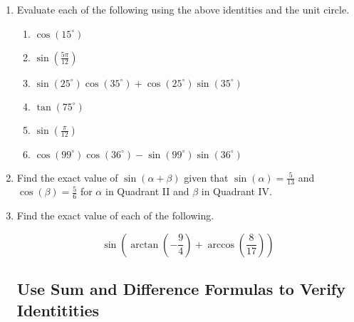 \begin{enumerate}
\vspace{-.1in}
\item Evaluate each of the following using the above identities and the unit circle.


\begin{enumerate}
\item $\cos\left(15^{\circ}\right)$
\vfill

\item $\sin\left(\frac{5\pi}{12}\right)$
\vfill

\newpage

\item $\sin\left(25^{\circ}\right)\cos\left(35^{\circ}\right) +\cos\left(25^{\circ}\right)\sin\left(35^{\circ}\right)$
\vfill

\item $\tan\left(75^{\circ}\right)$
\vfill

\item $\sin\left(\frac{\pi}{12}\right)$
\vfill
 
\item $\cos\left(99^{\circ}\right)\cos\left(36^{\circ}\right)-\sin\left(99^{\circ}\right)\sin\left(36^{\circ}\right)$
\vfill

\end{enumerate}

\newpage



\item Find the exact value of $\sin(\alpha + \beta)$ given that $\sin\left(\alpha\right) = \frac{5}{13}$ and $\cos\left(\beta\right) = \frac{5}{6}$ for $\alpha$ in Quadrant II and $\beta$ in Quadrant IV.
\vfill



\item Find the exact value of each of the following.

$$\sin \left( \arctan \left(-\frac{9}{4}\right)+\arccos \left(\frac{8}{17}\right)\right)$$
\vfill



\newpage

\subsection{Use Sum and Difference Formulas to Verify Identitities} ~


\end{enumerate}
